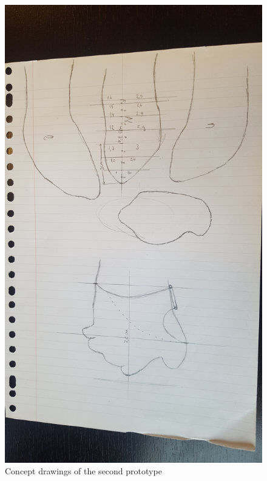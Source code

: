 \documentclass[11pt, a4paper]{article}
\begin{document}
\begin{figure}[h]
    \centering
    \includegraphics[scale=0.08, angle=180]{ConceptPrototype2.jpg}
    \caption{Concept drawings of the second prototype}
    \label{fig:ConceptPrototype2}
\end{figure} 

\newpage
\end{document}
